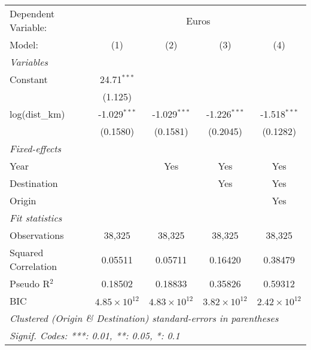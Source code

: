 \begingroup
\centering
\begin{tabular}{lcccc}
   \tabularnewline \midrule \midrule
   Dependent Variable: & \multicolumn{4}{c}{Euros}\\
   Model:              & (1)                   & (2)                   & (3)                   & (4)\\  
   \midrule
   \emph{Variables}\\
   Constant            & 24.71$^{***}$         &                       &                       &   \\   
                       & (1.125)               &                       &                       &   \\   
   log(dist\_km)       & -1.029$^{***}$        & -1.029$^{***}$        & -1.226$^{***}$        & -1.518$^{***}$\\   
                       & (0.1580)              & (0.1581)              & (0.2045)              & (0.1282)\\   
   \midrule
   \emph{Fixed-effects}\\
   Year                &                       & Yes                   & Yes                   & Yes\\  
   Destination         &                       &                       & Yes                   & Yes\\  
   Origin              &                       &                       &                       & Yes\\  
   \midrule
   \emph{Fit statistics}\\
   Observations        & 38,325                & 38,325                & 38,325                & 38,325\\  
   Squared Correlation & 0.05511               & 0.05711               & 0.16420               & 0.38479\\  
   Pseudo R$^2$        & 0.18502               & 0.18833               & 0.35826               & 0.59312\\  
   BIC                 & $4.85\times 10^{12}$  & $4.83\times 10^{12}$  & $3.82\times 10^{12}$  & $2.42\times 10^{12}$\\   
   \midrule \midrule
   \multicolumn{5}{l}{\emph{Clustered (Origin \& Destination) standard-errors in parentheses}}\\
   \multicolumn{5}{l}{\emph{Signif. Codes: ***: 0.01, **: 0.05, *: 0.1}}\\
\end{tabular}
\par\endgroup



